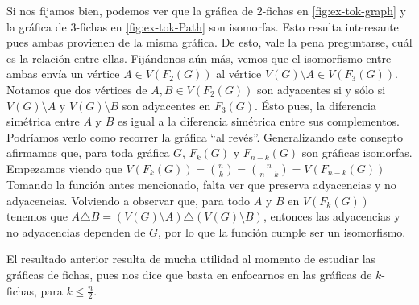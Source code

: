 Si nos fijamos bien, podemos ver que la gr\'afica de $2$-fichas en
\cref{fig:ex-tok-graph} y la gr\'afica de $3$-fichas en \cref{fig:ex-tok-Path}
son isomorfas. Esto resulta interesante pues ambas provienen de la misma
gr\'afica. De esto, vale la pena preguntarse, cu\'al es la relaci\'on entre
ellas. Fij\'andonos a\'un m\'as, vemos que el isomorfismo entre ambas env\'ia un
v\'ertice $A \in V(F_2(G))$ al v\'ertice $V(G) \setminus A \in V(F_3(G))$.
Notamos que dos v\'ertices de $ A,B \in V(F_2(G))$ son adyacentes si y s\'olo si
$V(G) \setminus A$ y $V(G) \setminus B$ son adyacentes en $F_3(G)$. \'Esto pues,
la diferencia sim\'etrica entre $A$ y $B$ es igual a la diferencia sim\'etrica
entre sus complementos. Podr\'iamos verlo como recorrer la gr\'afica ``al
rev\'es''. Generalizando este consepto afirmamos que, para toda gr\'afica $G$,
$F_k(G)$ y $F_{n-k}(G)$ son gr\'aficas isomorfas. Empezamos viendo que
$V(F_k(G)) =\binom{n}{k}= \binom{n}{n-k}= V(F_{n-k}(G))$ Tomando la funci\'on
antes mencionado, falta ver que preserva adyacencias y no adyacencias. Volviendo
a observar que, para todo $A$ y $B$ en $V(F_k(G))$ tenemos que $A \triangle B =
(V(G)\setminus A) \triangle (V(G)\setminus B)$, entonces las adyacencias y no
adyacencias dependen de $G$, por lo que la funci\'on cumple ser un isomorfismo. 

El resultado anterior resulta de mucha utilidad al momento de estudiar las
gr\'aficas de fichas, pues nos dice que basta en enfocarnos en las gr\'aficas de
$k$-fichas, para $k \leq \frac{n}{2}$.